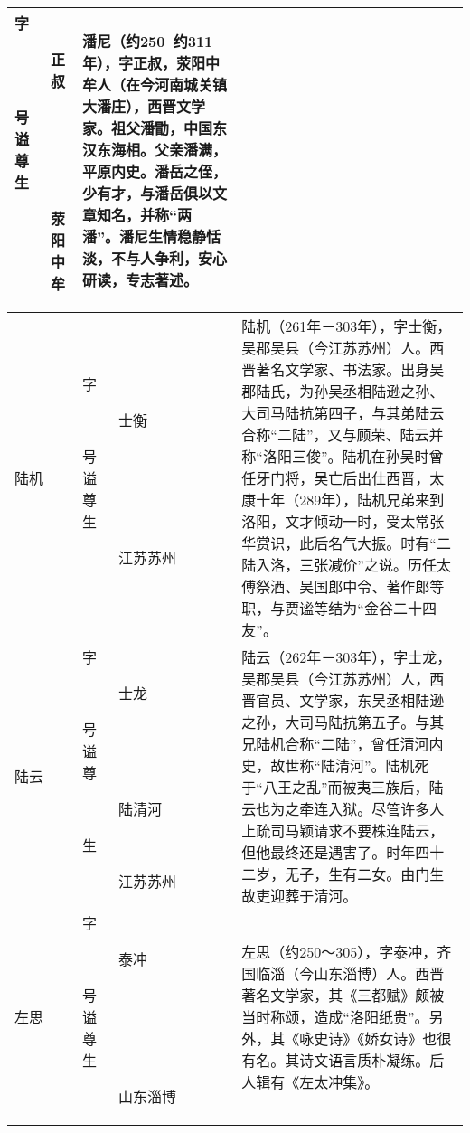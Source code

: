 \begin{longtable}{|>{\centering\namefont\heiti}m{2em}|>{\centering\tiny}m{3.0em}|>{\xzfont\kaiti}m{7em}|}
\begin{description}
  \item[字] 正叔
  \item[号] 
  \item[谥] 
  \item[尊] 
  \item[生] 荥阳中牟
  \end{description} & 潘尼（约250~约311年），字正叔，荥阳中牟人（在今河南城关镇大潘庄），西晋文学家。祖父潘勖，中国东汉东海相。父亲潘满，平原内史。潘岳之侄，少有才，与潘岳俱以文章知名，并称“两潘”。潘尼生情稳静恬淡，不与人争利，安心研读，专志著述。 \tabularnewline\hline
  陆机 & \begin{description}
  \item[字] 士衡
  \item[号] 
  \item[谥] 
  \item[尊] 
  \item[生] 江苏苏州
  \end{description} & 陆机（261年－303年），字士衡，吴郡吴县（今江苏苏州）人。西晋著名文学家、书法家。出身吴郡陆氏，为孙吴丞相陆逊之孙、大司马陆抗第四子，与其弟陆云合称“二陆”，又与顾荣、陆云并称“洛阳三俊”。陆机在孙吴时曾任牙门将，吴亡后出仕西晋，太康十年（289年），陆机兄弟来到洛阳，文才倾动一时，受太常张华赏识，此后名气大振。时有“二陆入洛，三张减价”之说。历任太傅祭酒、吴国郎中令、著作郎等职，与贾谧等结为“金谷二十四友”。 \tabularnewline\hline
  陆云 & \begin{description}
  \item[字] 士龙
  \item[号] 
  \item[谥] 
  \item[尊] 陆清河
  \item[生] 江苏苏州
  \end{description} & 陆云（262年－303年），字士龙，吴郡吴县（今江苏苏州）人，西晋官员、文学家，东吴丞相陆逊之孙，大司马陆抗第五子。与其兄陆机合称“二陆”，曾任清河内史，故世称“陆清河”。陆机死于“八王之乱”而被夷三族后，陆云也为之牵连入狱。尽管许多人上疏司马颖请求不要株连陆云，但他最终还是遇害了。时年四十二岁，无子，生有二女。由门生故吏迎葬于清河。 \tabularnewline\hline
  左思 & \begin{description}
  \item[字] 泰冲
  \item[号] 
  \item[谥] 
  \item[尊] 
  \item[生] 山东淄博
  \end{description} & 左思（约250～305），字泰冲，齐国临淄（今山东淄博）人。西晋著名文学家，其《三都赋》颇被当时称颂，造成“洛阳纸贵”。另外，其《咏史诗》《娇女诗》也很有名。其诗文语言质朴凝练。后人辑有《左太冲集》。 \tabularnewline\hline

\end{longtable}
